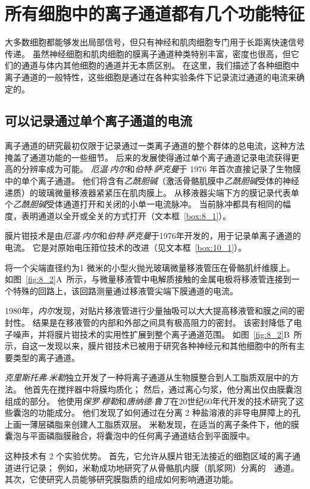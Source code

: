 \section{所有细胞中的离子通道都有几个功能特征}

大多数细胞都能够发出局部信号，但只有神经和肌肉细胞专门用于长距离快速信号传递。
虽然神经细胞和肌肉细胞的膜离子通道种类特别丰富，密度也很高，但它们的通道与体内其他细胞的通道并无本质区别。
在这里，我们描述了各种细胞中离子通道的一般特性，这些细胞是通过在各种实验条件下记录流过通道的电流来确定的。



\subsection{可以记录通过单个离子通道的电流}

离子通道的研究最初仅限于记录通过一类离子通道的整个群体的总电流，这种方法掩盖了通道功能的一些细节。
后来的发展使得通过单个离子通道记录电流获得更高的分辨率成为可能。
\textit{厄温$\cdot$内尔}和\textit{伯特$\cdot$萨克曼}于 1976 年首次直接记录了生物膜中的单个离子通道。
他们将含有\textit{乙酰胆碱}（激活骨骼肌膜中\textit{乙酰胆碱}受体的神经递质）的玻璃微量移液器紧紧压在肌肉膜上。
从移液器尖端下方的膜记录代表单个\textit{乙酰胆碱}受体通道打开和关闭的小单一电流脉冲。
当前脉冲都具有相同的幅度，表明通道以全开或全关的方式打开（文本框~\ref{box:8_1}）。


\begin{proposition} \label{box:8_1}
	
	\quad \quad 膜片钳技术是由\textit{厄温$\cdot$内尔}和\textit{伯特$\cdot$萨克曼}于1976年开发的，用于记录单离子通道的电流。
	它是对原始电压箝位技术的改进（见文本框~\ref{box:10_1}）。
	
	\quad \quad 将一个尖端直径约为1 微米的小型火抛光玻璃微量移液管压在骨骼肌纤维膜上。
	如图~\ref{fig:8_2}A~所示，与微量移液管中电解质接触的金属电极将移液管连接到一个特殊的回路上，该回路测量通过移液管尖端下膜通道的电流。
	
	\quad \quad 1980年，\textit{内尔}发现，对贴片移液管进行少量抽吸可以大大提高移液管和膜之间的密封性。
	结果是在移液管的内部和外部之间具有极高阻力的密封。
	该密封降低了电子噪声，并将膜片钳技术的实用性扩展到整个离子通道范围。
	如图~\ref{fig:8_2}B~所示，自这一发现以来，膜片钳技术已被用于研究各种神经元和其他细胞中的所有主要类型的离子通道。
	
	\quad \quad \textit{克里斯托弗$\cdot$米勒}独立开发了一种将离子通道从生物膜整合到人工脂质双层中的方法。
	他首先在搅拌器中将膜均质化；
	然后，通过离心匀浆，他分离出仅由膜囊泡组成的部分。
	他使用\textit{保罗$\cdot$穆勒}和\textit{唐纳德$\cdot$鲁丁}在20世纪60年代开发的技术研究了这些囊泡的功能成分。
	他们发现了如何通过在分离 2 种盐溶液的非导电屏障上的孔上画一薄层磷脂来创建人工脂质双层。
	米勒发现，在适当的离子条件下，他的膜囊泡与平面磷脂膜融合，将囊泡中的任何离子通道结合到平面膜中。
	
	\quad \quad 这种技术有 2 个实验优势。
	首先，它允许从膜片钳无法接近的细胞区域的离子通道进行记录；
	例如，米勒成功地研究了从骨骼肌内膜（肌浆网）分离的~~通道。
	其次，它使研究人员能够研究膜脂质的组成如何影响通道功能。
	
\end{proposition}


